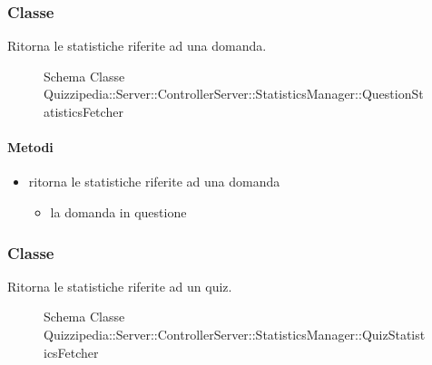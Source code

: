 \subsubsection{Classe }
Ritorna le statistiche riferite ad una domanda.
\begin{figure}[H]
\centering
\noindent{}
\caption[Schema Classe QuestionStatisticsFetcher]{Schema Classe Quizzipedia::Server::ControllerServer::StatisticsManager::QuestionStatisticsFetcher}
\end{figure}
\paragraph{Metodi}
\begin{itemize}
\item {}
\newline
ritorna le statistiche riferite ad una domanda
\newline
{}
\newline
\begin{itemize}
\item {}
\newline
la domanda in questione
\end{itemize}
\end{itemize}
\subsubsection{Classe }
Ritorna le statistiche riferite ad un quiz.
\begin{figure}[H]
\centering
\noindent{}
\caption[Schema Classe QuizStatisticsFetcher]{Schema Classe Quizzipedia::Server::ControllerServer::StatisticsManager::QuizStatisticsFetcher}
\end{figure}
